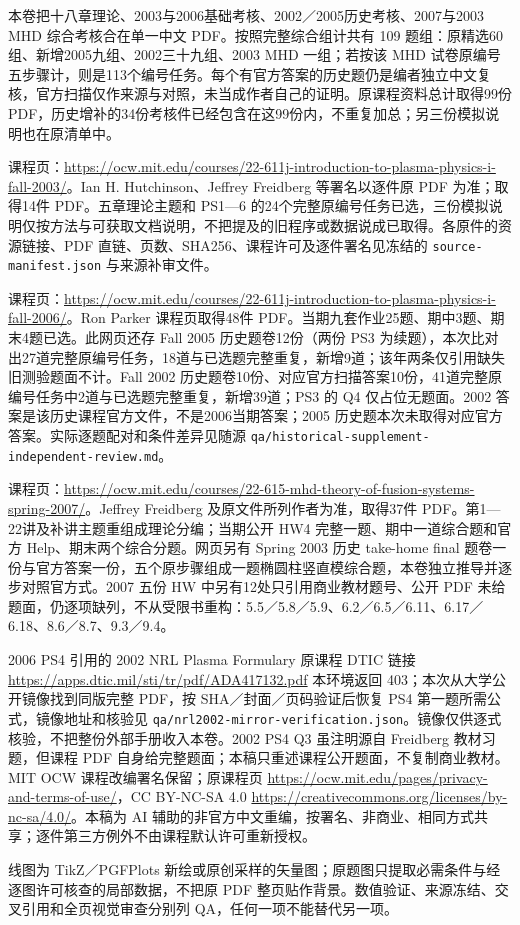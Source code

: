 本卷把十八章理论、2003与2006基础考核、2002／2005历史考核、2007与2003 MHD 综合考核合在单一中文 PDF。按照完整综合组计共有 109 题组：原精选60组、新增2005九组、2002三十九组、2003 MHD 一组；若按该 MHD 试卷原编号五步骤计，则是113个编号任务。每个有官方答案的历史题仍是编者独立中文复核，官方扫描仅作来源与对照，未当成作者自己的证明。原课程资料总计取得99份 PDF，历史增补的34份考核件已经包含在这99份内，不重复加总；另三份模拟说明也在原清单中。

课程页：\url{https://ocw.mit.edu/courses/22-611j-introduction-to-plasma-physics-i-fall-2003/}。Ian H. Hutchinson、Jeffrey Freidberg 等署名以逐件原 PDF 为准；取得14件 PDF。五章理论主题和 PS1—6 的24个完整原编号任务已选，三份模拟说明仅按方法与可获取文档说明，不把提及的旧程序或数据说成已取得。各原件的资源链接、PDF 直链、页数、SHA256、课程许可及逐件署名见冻结的 \texttt{source-manifest.json} 与来源补审文件。

课程页：\url{https://ocw.mit.edu/courses/22-611j-introduction-to-plasma-physics-i-fall-2006/}。Ron Parker 课程页取得48件 PDF。当期九套作业25题、期中3题、期末4题已选。此网页还存 Fall 2005 历史题卷12份（两份 PS3 为续题），本次比对出27道完整原编号任务，18道与已选题完整重复，新增9道；该年两条仅引用缺失旧测验题面不计。Fall 2002 历史题卷10份、对应官方扫描答案10份，41道完整原编号任务中2道与已选题完整重复，新增39道；PS3 的 Q4 仅占位无题面。2002 答案是该历史课程官方文件，不是2006当期答案；2005 历史题本次未取得对应官方答案。实际逐题配对和条件差异见随源 \texttt{qa/historical-supplement-independent-review.md}。

课程页：\url{https://ocw.mit.edu/courses/22-615-mhd-theory-of-fusion-systems-spring-2007/}。Jeffrey Freidberg 及原文件所列作者为准，取得37件 PDF。第1—22讲及补讲主题重组成理论分编；当期公开 HW4 完整一题、期中一道综合题和官方 Help、期末两个综合分题。网页另有 Spring 2003 历史 take-home final 题卷一份与官方答案一份，五个原步骤组成一题椭圆柱竖直模综合题，本卷独立推导并逐步对照官方式。2007 五份 HW 中另有12处只引用商业教材题号、公开 PDF 未给题面，仍逐项缺列，不从受限书重构：5.5／5.8／5.9、6.2／6.5／6.11、6.17／6.18、8.6／8.7、9.3／9.4。

2006 PS4 引用的 2002 NRL Plasma Formulary 原课程 DTIC 链接 \url{https://apps.dtic.mil/sti/tr/pdf/ADA417132.pdf} 本环境返回 403；本次从大学公开镜像找到同版完整 PDF，按 SHA／封面／页码验证后恢复 PS4 第一题所需公式，镜像地址和核验见 \texttt{qa/nrl2002-mirror-verification.json}。镜像仅供逐式核验，不把整份外部手册收入本卷。2002 PS4 Q3 虽注明源自 Freidberg 教材习题，但课程 PDF 自身给完整题面；本稿只重述课程公开题面，不复制商业教材。MIT OCW 课程改编署名保留；原课程页 \url{https://ocw.mit.edu/pages/privacy-and-terms-of-use/}，CC BY-NC-SA 4.0 \url{https://creativecommons.org/licenses/by-nc-sa/4.0/}。本稿为 AI 辅助的非官方中文重编，按署名、非商业、相同方式共享；逐件第三方例外不由课程默认许可重新授权。

线图为 TikZ／PGFPlots 新绘或原创采样的矢量图；原题图只提取必需条件与经逐图许可核查的局部数据，不把原 PDF 整页贴作背景。数值验证、来源冻结、交叉引用和全页视觉审查分别列 QA，任何一项不能替代另一项。
